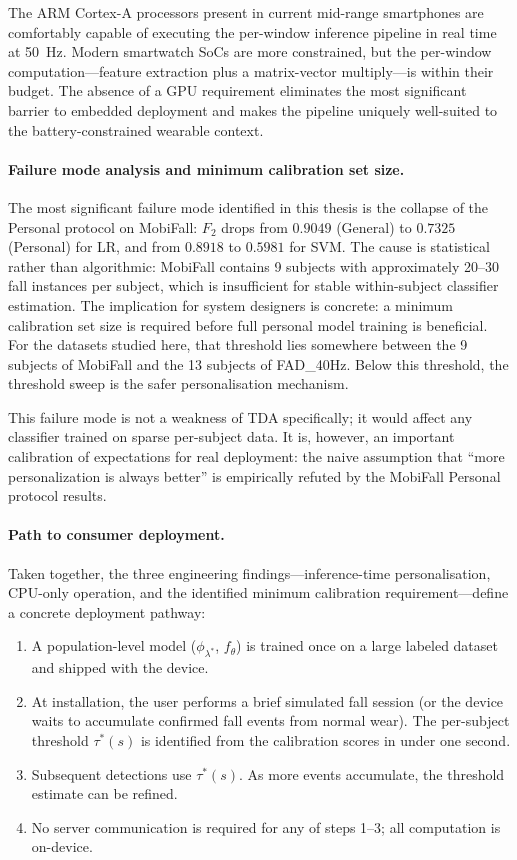 The ARM Cortex-A processors present in current mid-range smartphones are
comfortably capable of executing the per-window inference pipeline in real time at
50~Hz.  Modern smartwatch SoCs are more constrained, but the per-window
computation---feature extraction plus a matrix-vector multiply---is within their
budget.  The absence of a GPU requirement eliminates the most significant barrier
to embedded deployment and makes the pipeline uniquely well-suited to the
battery-constrained wearable context.

\paragraph{Failure mode analysis and minimum calibration set size.}
The most significant failure mode identified in this thesis is the collapse of
the Personal protocol on MobiFall: $F_2$ drops from $0.9049$ (General) to
$0.7325$ (Personal) for LR, and from $0.8918$ to $0.5981$ for SVM.  The cause is
statistical rather than algorithmic: MobiFall contains 9 subjects with
approximately 20--30 fall instances per subject, which is insufficient for stable
within-subject classifier estimation.  The implication for system designers is
concrete: a minimum calibration set size is required before full personal model
training is beneficial.  For the datasets studied here, that threshold lies somewhere
between the 9 subjects of MobiFall and the 13 subjects of FAD\_40Hz.  Below this
threshold, the threshold sweep is the safer personalisation mechanism.

This failure mode is not a weakness of TDA specifically; it would affect any
classifier trained on sparse per-subject data.  It is, however, an important
calibration of expectations for real deployment: the naive assumption that
``more personalization is always better'' is empirically refuted by the MobiFall
Personal protocol results.

\paragraph{Path to consumer deployment.}
Taken together, the three engineering findings---inference-time personalisation,
CPU-only operation, and the identified minimum calibration requirement---define a
concrete deployment pathway:

\begin{enumerate}
  \item A population-level model ($\phi_{\lambda^*}$, $f_\theta$) is trained once
    on a large labeled dataset and shipped with the device.
  \item At installation, the user performs a brief simulated fall session
    (or the device waits to accumulate confirmed fall events from normal wear).
    The per-subject threshold $\tau^*(s)$ is identified from the calibration
    scores in under one second.
  \item Subsequent detections use $\tau^*(s)$.  As more events accumulate, the
    threshold estimate can be refined.
  \item No server communication is required for any of steps 1--3; all computation
    is on-device.
\end{enumerate}


